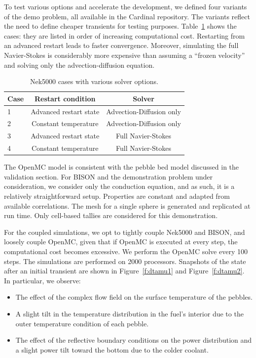 To test various options and accelerate the development, we defined four variants of the demo problem, all available in the Cardinal repository. The variants reflect the need to define cheaper transients for testing purposes. Table~\ref{tab:nek} shows the cases: they are listed in order of increasing computational cost. Restarting from an advanced restart leads to faster convergence. Moreover, simulating the full Navier-Stokes is considerably more expensive than assuming a ``frozen velocity'' and solving only the advection-diffusion equation.

\begin{table}
  \centering
  \begin{tabular}{|lcc|}
    \hline \hline
    Case & Restart condition & Solver \\
    \hline
    1 & Advanced restart state & Advection-Diffusion only \\
    2 & Constant temperature   & Advection-Diffusion only \\
    3 & Advanced restart state & Full Navier-Stokes \\
    4 & Constant temperature   & Full Navier-Stokes \\
    \hline \hline
  \end{tabular}
  \caption{Nek5000 cases with various solver options.}
  \label{tab:nek}
\end{table}

The OpenMC model is consistent with the pebble bed model discussed in the validation section. For BISON and the demonstration problem under consideration, we consider only the conduction equation, and as such, it is a relatively straightforward setup. Properties are constant and adapted from available correlations. The mesh for a single sphere is generated and replicated at run time. Only cell-based tallies are considered for this demonstration.

For the coupled simulations, we opt to tightly couple Nek5000 and BISON, and loosely couple OpenMC, given that if OpenMC is executed at every step, the computational cost becomes excessive. We perform the OpenMC solve every 100 steps. The simulations are performed on 2000 processors. Snapshots of the state after an initial transient are shown in Figure~\ref{f:dtamu1} and Figure~\ref{f:dtamu2}. In particular, we observe:
\begin{itemize}
  \item The effect of the complex flow field on the surface temperature of the pebbles.
  \item A slight tilt in the temperature distribution in the fuel's interior due to the outer temperature condition of each pebble.
  \item The effect of the reflective boundary conditions on the power distribution and a slight power tilt toward the bottom due to the colder coolant.
\end{itemize}

